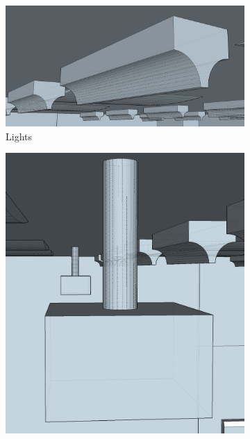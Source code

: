 \documentclass[../../main.tex]{subfiles}
\begin{document}

			\begin{figure}[ht]
				\begin{subfigure}[t]{4in}
					\centering
					\includegraphics[scale = 0.25]{Sections/Implementation/Modelling/images/lights2.png}
					\caption{Lights}
				\end{subfigure}
				\begin{subfigure}[t]{3in}
					\centering
					\includegraphics[scale = 0.25]{Sections/Implementation/Modelling/images/projector1.png}

\end{subfigure}
\end{figure}
\end{document}
